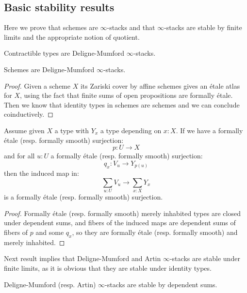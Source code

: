 \subsection{Basic stability results}

Here we prove that schemes are $\infty$-stacks and that $\infty$-stacks are stable by finite limits and the appropriate notion of quotient.

\begin{remark}
Contractible types are Deligne-Mumford $\infty$-stacks.
\end{remark}

\begin{lemma}
Schemes are Deligne-Mumford $\infty$-stacks.
\end{lemma}

\begin{proof}
Given a scheme $X$ its Zariski cover by affine schemes gives an étale atlas for $X$, using the fact that finite sums of open propositions are formally étale. Then we know that identity types in schemes are schemes and we can conclude coinductively.
\end{proof}

\begin{lemma}\label{sum-etale-etale}
Assume given $X$ a type with $Y_x$ a type depending on $x:X$. If we have a formally étale (resp. formally smooth) surjection:
\[p:U\to X\]
and for all $u:U$ a formally étale (resp. formally smooth) surjection:
\[q_x : V_u \to Y_{p(u)}\]
then the induced map in:
\[\sum_{u:U} V_u \to \sum_{x:X}Y_x\]
is a formally étale (resp. formally smooth) surjection.
\end{lemma}

\begin{proof}
Formally étale (resp. formally smooth) merely inhabited types are closed under dependent sums, and fibers of the induced maps are dependent sums of fibers of $p$ and some $q_x$, so they are formally étale (resp. formally smooth) and merely inhabited.
\end{proof}

Next result implies that Deligne-Mumford and Artin $\infty$-stacks are stable under finite limits, as it is obvious that they are stable under identity types.

\begin{proposition}\label{infty-stacks-sum}
Deligne-Mumford (resp. Artin) $\infty$-stacks are stable by dependent sums.
\end{proposition}

